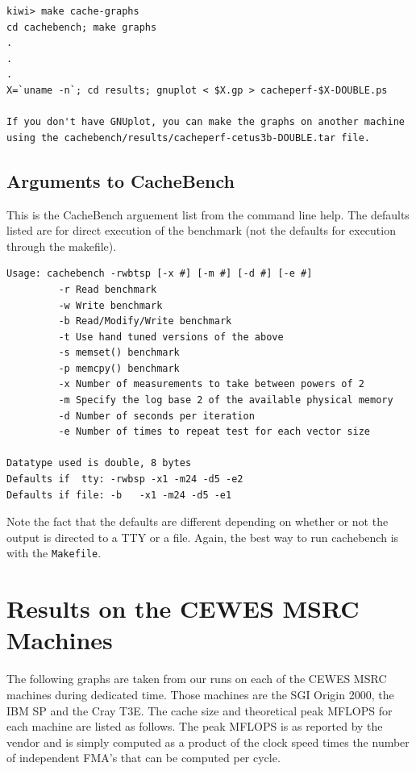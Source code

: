 \documentclass [12pt]{article}
\begin{document}
\begin{verbatim}
kiwi> make cache-graphs
cd cachebench; make graphs
.
.
.
X=`uname -n`; cd results; gnuplot < $X.gp > cacheperf-$X-DOUBLE.ps

If you don't have GNUplot, you can make the graphs on another machine
using the cachebench/results/cacheperf-cetus3b-DOUBLE.tar file.
\end{verbatim}

\subsection{Arguments to CacheBench}

This is the CacheBench arguement list from the command line help.  The defaults listed are
for direct execution of the benchmark (not the defaults for execution through the makefile).

\begin{verbatim}
Usage: cachebench -rwbtsp [-x #] [-m #] [-d #] [-e #]
         -r Read benchmark
         -w Write benchmark
         -b Read/Modify/Write benchmark
         -t Use hand tuned versions of the above
         -s memset() benchmark
         -p memcpy() benchmark
         -x Number of measurements to take between powers of 2
         -m Specify the log base 2 of the available physical memory
         -d Number of seconds per iteration
         -e Number of times to repeat test for each vector size

Datatype used is double, 8 bytes
Defaults if  tty: -rwbsp -x1 -m24 -d5 -e2
Defaults if file: -b   -x1 -m24 -d5 -e1
\end{verbatim}

Note the fact that the defaults are different depending on whether or not the
output is directed to a TTY or a file. Again, the best way to run cachebench
is with the {\tt Makefile}.

\clearpage
\newpage

\section{Results on the CEWES MSRC Machines}

The following graphs are taken from our runs on each of the CEWES
MSRC machines during dedicated time. Those machines are the SGI Origin
2000, the IBM SP and the Cray T3E. The cache size and theoretical 
peak MFLOPS for each machine are listed as follows. The peak MFLOPS
is as reported by the vendor and is simply computed as a product of 
the clock speed times the number of independent FMA's that can be
computed per cycle.
\end{document}
